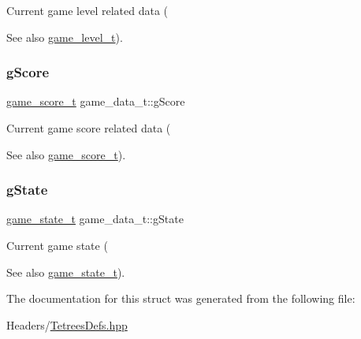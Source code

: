 Current game level related data (\begin{DoxySeeAlso}{See also}
\hyperlink{structgame__level__t}{game\+\_\+level\+\_\+t}). 
\end{DoxySeeAlso}
\mbox{\label{structgame__data__t_a70e04b66160685cc84bcdd30edb97e46}} 
\subsubsection{\texorpdfstring{g\+Score}{gScore}}
{\footnotesize\ttfamily \hyperlink{structgame__score__t}{game\+\_\+score\+\_\+t} game\+\_\+data\+\_\+t\+::g\+Score}

Current game score related data (\begin{DoxySeeAlso}{See also}
\hyperlink{structgame__score__t}{game\+\_\+score\+\_\+t}). 
\end{DoxySeeAlso}
\mbox{\label{structgame__data__t_a48253f7b6212e0ff99d5d5960b79476d}} 
\subsubsection{\texorpdfstring{g\+State}{gState}}
{\footnotesize\ttfamily \hyperlink{TetreesDefs_8hpp_aebae08b2e3a36f1452b33acaf1eaab40}{game\+\_\+state\+\_\+t} game\+\_\+data\+\_\+t\+::g\+State}

Current game state (\begin{DoxySeeAlso}{See also}
\hyperlink{TetreesDefs_8hpp_aebae08b2e3a36f1452b33acaf1eaab40}{game\+\_\+state\+\_\+t}). 
\end{DoxySeeAlso}


The documentation for this struct was generated from the following file\+:\begin{DoxyCompactItemize}
\item 
Headers/\hyperlink{TetreesDefs_8hpp}{Tetrees\+Defs.\+hpp}\end{DoxyCompactItemize}

